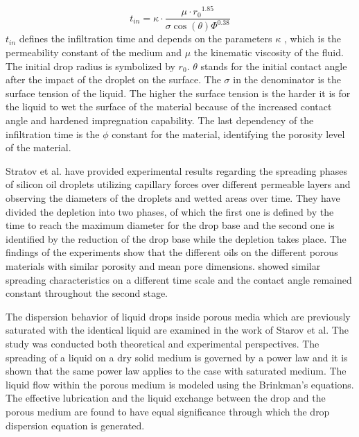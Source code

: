 \begin{equation}\label{eq:InfTime}
t_{in}=\kappa \cdotp {\frac{\mu \cdotp r{_0}^{1.85}}{\sigma \cos({\theta})\varPhi^{0.38}}}
\end{equation}
\newline
$t_{in}$ defines the infiltration time and depends on the parameters $\kappa$ , which is the permeability constant of the medium and $\mu$ the kinematic viscosity of the fluid. The initial drop radius is symbolized by $r_{0}$. $\theta$ stands for the initial contact angle after the impact of the droplet on the surface. The $\sigma$ in the denominator is the surface tension of the liquid. The higher the surface tension is the harder it is for the liquid to wet the surface of the material because of the increased contact angle and hardened impregnation capability. The last dependency of the infiltration time is  the $\phi$ constant for the material, identifying the porosity level of the material. \citep{markicevic2009infiltration}

Stratov et al. have provided experimental results regarding  the spreading phases of silicon oil droplets utilizing capillary forces over different permeable layers and observing the diameters of the droplets and wetted areas over time. They have divided the depletion into two phases, of which the first one is defined by the time to reach the maximum diameter for the drop base and the second one is identified by the reduction of the drop base while the depletion takes place. The findings of the experiments show that the different oils on the different porous materials with similar porosity and mean pore dimensions. showed similar spreading characteristics on a different time scale and the contact angle remained constant throughout the second stage.\citep{starov2002thick}

The dispersion behavior of liquid drops inside porous media which are previously saturated with the identical liquid are examined in the work of Starov et al. The study was conducted both theoretical and experimental perspectives. The spreading of a liquid on a dry solid medium is governed by a power law and it is shown that the same power law applies to the case with saturated medium. The liquid flow within the porous medium is modeled using the Brinkman’s equations. The effective lubrication and the liquid exchange between the drop and the porous medium are found to have equal significance through which the drop dispersion equation is generated. \citep{starov2002saturated}
\newline

